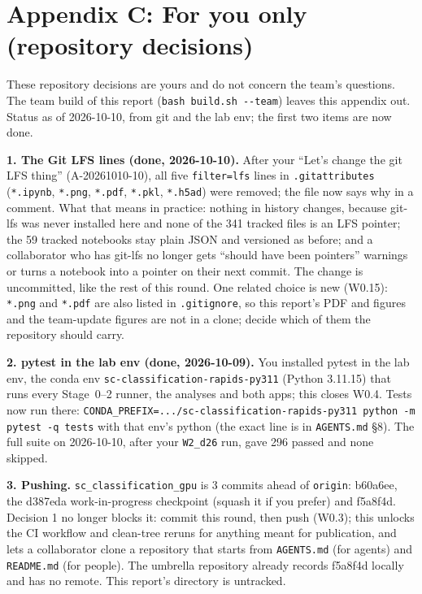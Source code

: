 \section*{Appendix C: For you only (repository decisions)}
{}
\label{app:foryou}

These repository decisions are yours and do not concern the team's questions. The team build of this report (\texttt{bash build.sh -{}-team}) leaves this appendix out. Status as of 2026-10-10, from git and the lab env; the first two items are now done.

\textbf{1. The Git LFS lines (done, 2026-10-10).} After your ``Let's change the git LFS thing'' (A-20261010-10), all five \texttt{filter=lfs} lines in \texttt{.gitattributes} (\texttt{*.ipynb}, \texttt{*.png}, \texttt{*.pdf}, \texttt{*.pkl}, \texttt{*.h5ad}) were removed; the file now says why in a comment. What that means in practice: nothing in history changes, because git-lfs was never installed here and none of the 341 tracked files is an LFS pointer; the 59 tracked notebooks stay plain JSON and versioned as before; and a collaborator who has git-lfs no longer gets ``should have been pointers'' warnings or turns a notebook into a pointer on their next commit. The change is uncommitted, like the rest of this round. One related choice is new (W0.15): \texttt{*.png} and \texttt{*.pdf} are also listed in \texttt{.gitignore}, so this report's PDF and figures and the team-update figures are not in a clone; decide which of them the repository should carry. 

\textbf{2. pytest in the lab env (done, 2026-10-09).} You installed pytest in the lab env, the conda env \texttt{sc-classification-\allowbreak rapids-py311} (Python 3.11.15) that runs every Stage~0--2 runner, the analyses and both apps; this closes W0.4. Tests now run there: \texttt{CONDA\_PREFIX=...\allowbreak/sc-classification-rapids-py311 python -m pytest -q tests} with that env's python (the exact line is in \texttt{AGENTS.md} \S8). The full suite on 2026-10-10, after your \texttt{W2\_d26} run, gave 296 passed and none skipped.

\textbf{3. Pushing.} \texttt{sc\_classification\_gpu} is 3 commits ahead of \texttt{origin}: b60a6ee, the d387eda work-in-progress checkpoint (squash it if you prefer) and f5a8f4d. Decision 1 no longer blocks it: commit this round, then push (W0.3); this unlocks the CI workflow and clean-tree reruns for anything meant for publication, and lets a collaborator clone a repository that starts from \texttt{AGENTS.md} (for agents) and \texttt{README.md} (for people). The umbrella repository already records f5a8f4d locally and has no remote. This report's directory is untracked.

